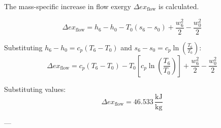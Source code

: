 The mass-specific increase in flow exergy \( \Delta ex_{\text{flow}} \) is calculated.  

\[
\Delta ex_{\text{flow}} = h_6 - h_0 - T_0(s_6 - s_0) + \frac{w_6^2}{2} - \frac{w_0^2}{2}
\]  

Substituting \( h_6 - h_0 = c_p(T_6 - T_0) \) and \( s_6 - s_0 = c_p \ln \left( \frac{T_6}{T_0} \right) \):  
\[
\Delta ex_{\text{flow}} = c_p(T_6 - T_0) - T_0 \left[ c_p \ln \left( \frac{T_6}{T_0} \right) \right] + \frac{w_6^2}{2} - \frac{w_0^2}{2}
\]  

Substituting values:  
\[
\Delta ex_{\text{flow}} = 46.533 \, \frac{\text{kJ}}{\text{kg}}
\]  

---